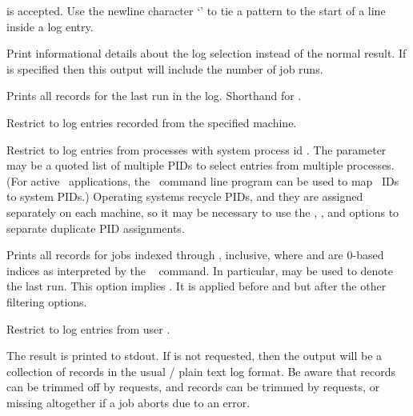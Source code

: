 \begin{description}
  is accepted. Use the newline character `' to tie a pattern to
  the start of a line inside a log entry.
\item[\optkey{-info}] Print informational details about the log
  selection instead of the normal result. If  is specified
  then this output will include the number of job runs.
\item[\optkey{-lastrun}] Prints all records for the last run in
  the log. Shorthand for .
\item[\optkey{-machine name}] Restrict to log entries recorded from the
  specified machine.
\item[\optkey{-pid pid}] Restrict to log entries from processes with
  system process id . The  parameter may be a quoted
  list of multiple PIDs to select entries from multiple processes. (For
  active \OOMMF\ applications, the \OOMMF\ command line program
   can
  be used to map \OOMMF\ IDs to system PIDs.)  Operating systems recycle
  PIDs, and they are assigned separately on each machine, so it may be
  necessary to use the , , and 
  options to separate duplicate PID assignments.
\item[\optkey{-runselect first last}] Prints all records for jobs
  indexed  through , inclusive, where  and
   are 0-based indices as interpreted by the \Tcl\ 
  command. In particular,  may be used to denote the last
  run. This option implies . It is applied before
   and  but after the other filtering options.
\item[\optkey{-user username}] Restrict to log entries from user
  .
\end{description}
The result is printed to stdout. If  is not requested, then
the output will be a collection of records in the usual
/ plain text log format. Be aware that 
records can be trimmed off by  requests, and  records
can be trimmed by  requests, or missing altogether if a
job aborts due to an error.

